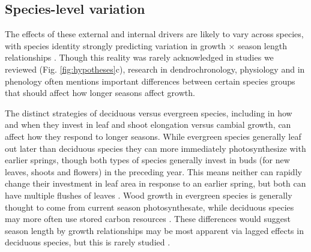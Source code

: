 \documentclass[11pt]{article}
\begin{document}
\subsection*{Species-level variation}
The effects of these external and internal drivers are likely to vary across species, with species identity strongly predicting variation in growth $\times$ season length relationships \citep[e.g.][]{cuny2012life,michelot2012comparing}. Though this reality was rarely acknowledged in studies we reviewed (Fig. \ref{fig:hypotheses}c), research in dendrochronology, physiology and in phenology often mentions important differences between certain species groups that should affect how longer seasons affect growth. 

The distinct strategies of deciduous versus evergreen species, including in how and when they invest in leaf and shoot elongation versus cambial growth, can affect how they respond to longer seasons. While evergreen species generally leaf out later than deciduous species they can more immediately photosynthesize with earlier springs, though both types of species generally invest in buds (for new leaves, shoots and flowers) in the preceding year. This means neither can rapidly change their investment in leaf area in response to an earlier spring, but both can have multiple flushes of leaves \citep{day2011regulation,soolanayakanahally2013timing}. Wood growth in evergreen species is generally thought to come from current season photosynthesate, while deciduous species may more often use stored carbon resources \citep{gordon1968seasonal,monson2018finding}. These differences would suggest season length by growth relationships
may be most apparent via lagged effects in deciduous species, but this is rarely studied  \citep[and not clearly supported to date, see][]{coulthard2020limits,klesse2023legacy}. %
\end{document}
